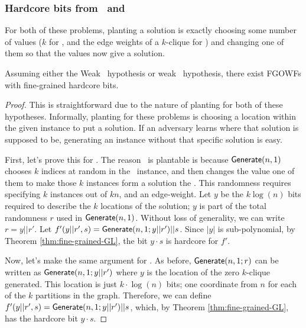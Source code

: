 \subsubsection{Hardcore bits from \kSum~and \zkclique}
For both of these problems, planting a solution is exactly choosing some number of values ($k$ for \kSum, and the edge weights of a $k$-clique for \zkclique) and  changing one of them so that the values now give a solution.

\begin{corollary}
	Assuming either the Weak \kSum~hypothesis or weak \zkclique~hypothesis, there exist FGOWFs with fine-grained hardcore bits.
	\label{cor:hardcorebitkclique}
\end{corollary}
\begin{proof}
	This is straightforward due to the nature of planting for both of these hypotheses. Informally, planting for these problems is choosing a location within the given instance to put a solution. If an adversary learns where that solution is supposed to be, generating an instance without that specific solution is easy.
	
	First, let's prove this for \kSum. The reason \kSum~is plantable is because $\mathsf{Generate}(n,1)$ chooses $k$ indices at random in the \kSum~instance, and then changes the value one of them to make those $k$ instances form a solution the \kSum. This randomness requires specifying $k$ instances out of $kn$, and an edge-weight. Let $y$ be the $k\log(n)$ bits required to describe the $k$ locations of the solution; $y$ is part of the total randomness $r$ used in $\mathsf{Generate}(n,1)$. Without loss of generality, we can write $r = y||r'$. Let $f'(y||r', s) = \mathsf{Generate}(n,1; y||r')|| s$. Since $|y|$ is sub-polynomial, by Theorem \ref{thm:fine-grained-GL}, the bit $y \cdot s$ is hardcore for $f'$.
	
	Now, let's make the same argument for \zkclique. As before, $\mathsf{Generate}(n,1;r)$ can be written as $\mathsf{Generate}(n,1;y||r')$ where $y$ is the location of the zero $k$-clique generated. This location is just $k \cdot \log(n)$ bits; one coordinate from $n$ for each of the $k$ partitions in the graph. Therefore, we can define $f'(y||r', s) = \mathsf{Generate}(n,1;y||r') || s$, which, by Theorem \ref{thm:fine-grained-GL}, has the hardcore bit $y \cdot s$.
\end{proof}

